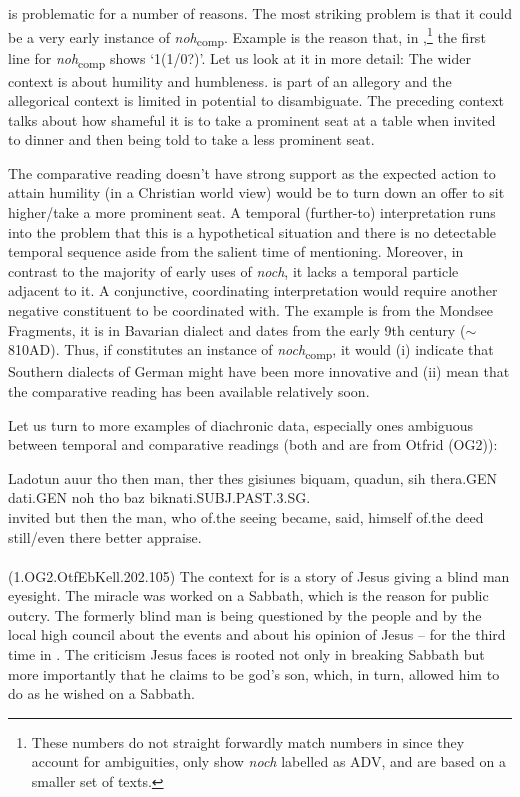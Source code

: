 \documentclass[output=paper
,modfonts
,nonflat]{langsci/langscibook}
\begin{document}
 is problematic for a number of reasons. The most striking problem is that it could be a very early instance of \textit{noh}\textsubscript{comp}. Example  is the reason that, in ,\footnote{These numbers do not straight forwardly match numbers in  since they account for ambiguities, only show \textit{noch} labelled as ADV, and are based on a smaller set of texts.} the first line for \textit{noh}\textsubscript{comp} shows `1(1/0?)'. Let us look at it in more detail: The wider context is about humility and humbleness.  is part of an allegory and the allegorical context is limited in potential to disambiguate. The preceding context talks about how shameful it is to take a prominent seat at a table when invited to dinner and then being told to take a less prominent seat.

The comparative reading doesn't have strong support as the expected action to attain humility (in a Christian world view) would be to turn down an offer to sit higher/take a more prominent seat. A temporal (further-to) interpretation runs into the problem that this is a hypothetical situation and there is no detectable temporal sequence aside from the salient time of mentioning. Moreover, in contrast to the majority of early uses of \textit{noch}, it lacks a temporal particle adjacent to it. A conjunctive, coordinating interpretation would require another negative constituent to be coordinated with. The example is from the Mondsee Fragments, it is in Bavarian dialect and dates from the early 9th century ($\sim$ 810AD)\citep{annis_og}. Thus, if  constitutes an instance of \textit{noch}\textsubscript{comp}, it would (i) indicate that Southern dialects of German might have been more innovative and (ii) mean that the comparative reading has been available relatively soon.

Let us turn to more examples of diachronic data, especially ones ambiguous between temporal and comparative readings (both  and  are from Otfrid (OG2)):

\ea\gll Ladotun auur tho then man, ther thes gisiunes biquam, quadun, sih thera.GEN dati.GEN noh tho baz biknati.SUBJ.PAST.3.SG.\\
       invited but then the man, who of.the seeing became, said, himself of.the deed still/even there better appraise.\\
\label{OG2_noch_blind_man} \\  (1.OG2.OtfEbKell.202.105)
\z
The context for  is a story of Jesus giving a blind man eyesight. The miracle was worked on a Sabbath, which is the reason for public outcry. The formerly blind man is being questioned by the people and by the local high council about the events and about his opinion of Jesus -- for the third time in . The criticism Jesus faces is rooted not only in breaking Sabbath but more importantly that he claims to be god's son, which, in turn, allowed him to do as he wished on a Sabbath.
\end{document}
